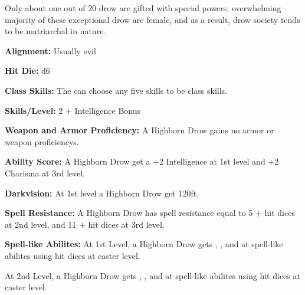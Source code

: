 
Only about one out of 20 drow are gifted with special powers, overwhelming majority of these exceptional drow are female, and as a result, drow society tends to be matriarchal in nature.

\textbf{Alignment:} Usually evil

\textbf{Hit Die:} d6

\textbf{Class Skills:} The \currentclassname{} can choose any five skills to be class skills.

\textbf{Skills/Level:} 2 + Intelligence Bonus

\modebab{}
\poorfor{}
\goodref{}
\poorwil{}

\begin{classtable}
\end{classtable}

\classfeatures

\textbf{Weapon and Armor Proficiency:} A Highborn Drow gains no armor or weapon proficiencys.

\textbf{Ability Score:} A Highborn Drow get a +2 Intelligence at 1st level and +2 Charisma at 3rd level.

\textbf{Darkvision:} At 1st level a Highborn Drow get  120ft.

\textbf{Spell Resistance:} A Highborn Drow has spell resistance equal to 5 + hit dices at 2nd level, and 11 + hit dices at 3rd level.

\textbf{Spell-like Abilites:} At 1st Level, a Highborn Drow gets , , and  at spell-like abilites using hit dices at caster level.

At 2nd Level, a Highborn Drow gets , , and  at spell-like abilites using hit dices at caster level.



